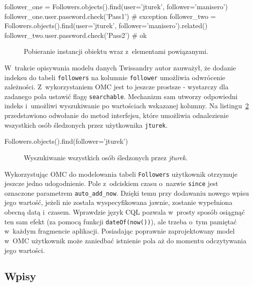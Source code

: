 \begin{verbbox}
	follower_one = Followers.objects().find(user='jturek', 
	                   follower='manisero')
	follower_one.user.password.check('Pass1') # exception
	follower_two = Followers.objects().find(user='jturek',
	                   follower='manisero').related()
	follower_two.user.password.check('Pass2') # ok
\end{verbbox}

\begin{figure}[ht!]
	\centering
	\theverbbox
	\caption{Pobieranie instancji obiektu wraz z~elementami powiązanymi.}
	\label{vrb:omc_twissandra_followers_relation_eager}
\end{figure}

W~trakcie opisywania modelu danych Twissandry autor zauważył, że dodanie indeksu do tabeli \verb+followers+ na kolumnie \verb+follower+ umożliwia odwrócenie zależności. Z~wykorzystaniem OMC jest to jeszcze prostsze - wystarczy dla zadanego pola ustawić flagę \verb+searchable+. Mechanizm sam utworzy odpowiedni indeks i~umożliwi wyszukiwanie po wartościach wskazanej kolumny. Na listingu~\ref{vrb:omc_twissandra_searching_followers} przedstawiono odwołanie do metod interfejsu, które umożliwia odnalezienie wszystkich osób śledzonych przez użytkownika \verb+jturek+.

\begin{verbbox}
	Followers.objects().find(follower='jturek')
\end{verbbox}

\begin{figure}[ht!]
	\centering
	\theverbbox
	\caption{Wyszukiwanie wszystkich osób śledzonych przez \emph{jturek}.}
	\label{vrb:omc_twissandra_searching_followers}
\end{figure}

Wykorzystując OMC do modelowania tabeli \verb+Followers+ użytkownik otrzymuje jeszcze jedno udogodnienie. Pole z~odciskiem czasu o~nazwie \verb+since+ jest oznaczone parametrem \verb+auto_add_now+. Dzięki temu przy dodawaniu nowego wpisu jego wartość, jeżeli nie została wyspecyfikowana jawnie, zostanie wypełniona obecną datą i~czasem. Wprawdzie język CQL pozwala w~prosty sposób osiągnąć ten sam efekt (za pomocą funkcji \verb+dateOf(now())+), ale trzeba o~tym pamiętać w~każdym fragmencie aplikacji. Posiadając poprawnie zaprojektowany model w~OMC użytkownik może zaniedbać istnienie pola aż do momentu odczytywania jego wartości.

\subsection{Wpisy}

